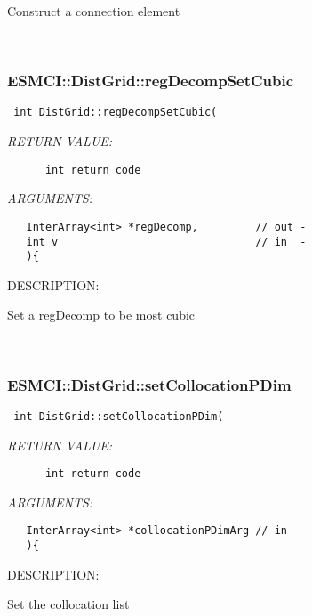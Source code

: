       Construct a connection element
   
 
\mbox{}\hrulefill\
 
\subsubsection [ESMCI::DistGrid::regDecompSetCubic] {ESMCI::DistGrid::regDecompSetCubic}


  
\begin{verbatim} int DistGrid::regDecompSetCubic(\end{verbatim}{\em RETURN VALUE:}
\begin{verbatim}      int return code\end{verbatim}{\em ARGUMENTS:}
\begin{verbatim}   InterArray<int> *regDecomp,         // out -
   int v                               // in  -
   ){\end{verbatim}
{\sf DESCRIPTION:\\ }


      Set a regDecomp to be most cubic
   
 
\mbox{}\hrulefill\
 
\subsubsection [ESMCI::DistGrid::setCollocationPDim] {ESMCI::DistGrid::setCollocationPDim}


  
\begin{verbatim} int DistGrid::setCollocationPDim(\end{verbatim}{\em RETURN VALUE:}
\begin{verbatim}      int return code\end{verbatim}{\em ARGUMENTS:}
\begin{verbatim}   InterArray<int> *collocationPDimArg // in
   ){\end{verbatim}
{\sf DESCRIPTION:\\ }


      Set the collocation list
   
 
